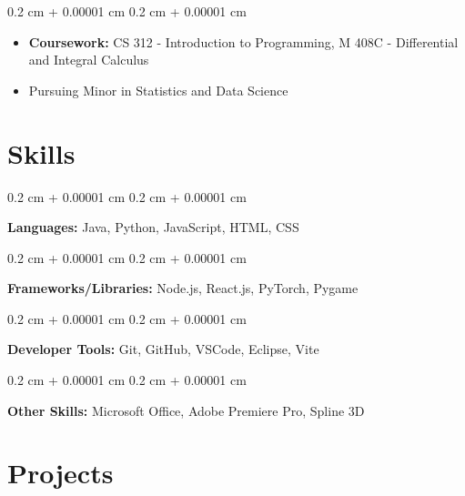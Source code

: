 \documentclass[10pt, letterpaper]{article}
\newenvironment{highlights}{
    \begin{itemize}[
        topsep=0.10 cm,
        parsep=0.10 cm,
        partopsep=0pt,
        itemsep=0pt,
        leftmargin=0.4 cm + 10pt
    ]
}{
    \end{itemize}
} %
\newenvironment{onecolentry}{
    \begin{adjustwidth}{
        0.2 cm + 0.00001 cm
    }{
        0.2 cm + 0.00001 cm
    }
}{
    \end{adjustwidth}
} %
\begin{document}
        \vspace{0.10 cm}
        \begin{onecolentry}
            \begin{highlights}
                \item \textbf{Coursework:} CS 312 - Introduction to Programming, M 408C - Differential and Integral Calculus
                \item Pursuing Minor in Statistics and Data Science
            \end{highlights}
        \end{onecolentry}



    
    \section{Skills}



        
        \begin{onecolentry}
            \textbf{Languages:} Java, Python, JavaScript, HTML, CSS
        \end{onecolentry}

        \vspace{0.2 cm}

        \begin{onecolentry}
            \textbf{Frameworks/Libraries:} Node.js, React.js, PyTorch, Pygame
        \end{onecolentry}

        \vspace{0.2 cm}

        \begin{onecolentry}
            \textbf{Developer Tools:} Git, GitHub, VSCode, Eclipse, Vite
        \end{onecolentry}

        \vspace{0.2 cm}

        \begin{onecolentry}
            \textbf{Other Skills:} Microsoft Office, Adobe Premiere Pro, Spline 3D
        \end{onecolentry}


    
    \section{Projects}
\end{document}
